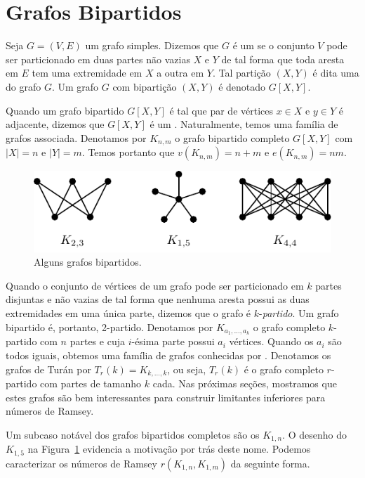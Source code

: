 \section{Grafos Bipartidos}

Seja $G = (V,E)$ um grafo simples. Dizemos que $G$ é um  se o conjunto $V$ pode ser particionado em duas partes não vazias $X$ e $Y$ de tal forma que toda aresta em $E$ tem uma extremidade em $X$ a outra em $Y$. Tal partição $(X,Y)$ é dita uma  do grafo $G$. Um grafo $G$ com bipartição $(X,Y)$ é denotado $G[X,Y]$.

Quando um grafo bipartido $G[X,Y]$ é tal que par de vértices $x \in X$ e $y \in Y$ é adjacente, dizemos que $G[X,Y]$ é um . Naturalmente, temos uma família de grafos associada. Denotamos por $K_{n,m}$ o grafo bipartido completo $G[X,Y]$ com $|X| = n$ e $|Y| = m$. Temos portanto que $v(K_{n,m}) = n + m$ e $e(K_{n,m}) = nm$.

\begin{figure}[ht!]
\centering
\includegraphics{figures/3_graph_1_part}
\caption{Alguns grafos bipartidos.}
\label{graph:fig:part}
\end{figure}

Quando o conjunto de vértices de um grafo pode ser particionado em $k$ partes disjuntas e não vazias de tal forma que nenhuma aresta possui as duas extremidades em uma única parte, dizemos que o grafo é $k$-\emph{partido}. Um grafo bipartido é, portanto, 2-partido. Denotamos por $K_{a_1, \dots, a_k}$ o grafo completo $k$-partido com $n$ partes e cuja $i$-ésima parte possui $a_i$ vértices. Quando os $a_i$ são todos iguais, obtemos uma família de grafos conhecidas por . Denotamos os grafos de Turán por $T_r(k) = K_{k, \dots, k}$, ou seja, $T_r(k)$ é o grafo completo $r$-partido com partes de tamanho $k$ cada. Nas próximas seções, mostramos que estes grafos são bem interessantes para construir limitantes inferiores para números de Ramsey.

Um subcaso notável dos grafos bipartidos completos são os  $K_{1,n}$. O desenho do $K_{1,5}$ na Figura~\ref{graph:fig:part} evidencia a motivação por trás deste nome. Podemos caracterizar os números de Ramsey $r(K_{1,n}, K_{1,m})$ da seguinte forma.

